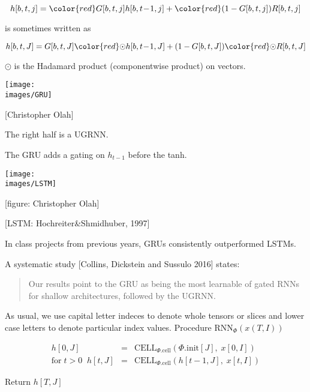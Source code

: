 {

$$h[b,t,j] =  {\color{red} G[b,t,j]}h[b,t\!-\!1,j] + {\color{red} (1-G[b,t,j])}R[b,t,j]$$

\vfill
is sometimes written as

$$h[b,t,J] =  G[b,t,J]{\color{red} \odot} h[b,t\!-\!1,J] + (1-G[b,t,J]){\color{red} \odot} R[b,t,J]$$

\vfill
$\odot$ is the Hadamard product (componentwise product) on vectors.


\centerline{\texttt{[image: \\images/GRU]}}
\centerline{{\huge [Christopher Olah]}}

\vfill
The right half is a UGRNN.

\vfill
The GRU adds a gating on $h_{t-1}$ before the tanh.

\centerline{\texttt{[image: \\images/LSTM]}}
\centerline{{\large [figure: Christopher Olah]}}

\centerline{\Large [LSTM: Hochreiter\&Shmidhuber, 1997]}


\vfill
In class projects from previous years, GRUs consistently outperformed LSTMs.

\vfill
A systematic study [Collins, Dickstein and Sussulo 2016] states:

\begin{quotation}
  Our results point to the GRU as being the most learnable of gated RNNs for shallow architectures, followed by the UGRNN.
\end{quotation}

As usual, we use capital letter indeces to denote whole tensors or slices and lower case letters to denote particular index values.
\vfill
Procedure $\mathrm{RNN}_\Phi(x(T,I))$

\begin{eqnarray*}
h[0,J] &  = &  \mathrm{CELL}_{\Phi.\mathrm{cell}}(\Phi.\mathrm{init}[J],\;x[0,I]) \\
\mathrm{for}\;t>0\;\;h[t,J] &  =  & \mathrm{CELL}_{\Phi.\mathrm{cell}}(h[t-1,J],\;x[t,I])
\end{eqnarray*}

\vfill
Return $h[T,J]$




}

